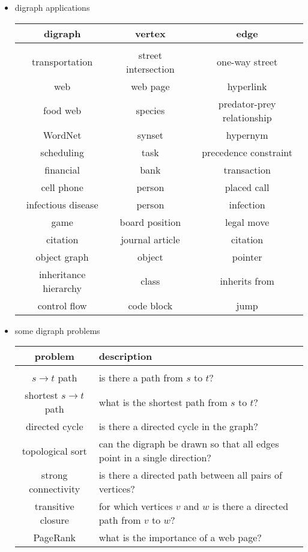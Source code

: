 \documentclass[8pt,a4paper,compress]{beamer}
\begin{document}
\begin{frame}[fragile]
\begin{itemize}
\item digraph applications
\begin{center}
\begin{tabular}{ccc}
\textbf{digraph} & \textbf{vertex} & \textbf{edge} \\ \hline \\
transportation & street intersection & one-way street \\
web & web page & hyperlink \\
food web & species & predator-prey relationship \\
WordNet & synset & hypernym \\
scheduling & task & precedence constraint \\
financial & bank & transaction \\
cell phone & person & placed call \\
infectious disease & person & infection \\
game & board position & legal move \\
citation & journal article & citation \\
object graph & object & pointer \\
inheritance hierarchy & class & inherits from \\ 
control flow & code block & jump
\end{tabular}  
\end{center}
\end{itemize}
\end{frame}

\begin{frame}[fragile]
\begin{itemize}
\item some digraph problems
\begin{center}
\begin{tabular}{cp{5cm}}
\textbf{problem} & \textbf{description} \\ \hline \\
$s\to t$ path & is there a path from $s$ to $t$? \\ 
shortest $s\to t$ path & what is the shortest path from $s$ to $t$? \\
directed cycle & is there a directed cycle in the graph? \\
topological sort & can the digraph be drawn so that all edges point in a single direction? \\
strong connectivity & is there a directed path between all pairs of vertices? \\
transitive closure & for which vertices $v$ and $w$ is there a directed path from $v$ to $w$? \\
PageRank & what is the importance of a web page?
\end{tabular}  
\end{center}
\end{itemize}
\end{frame}
\end{document}
